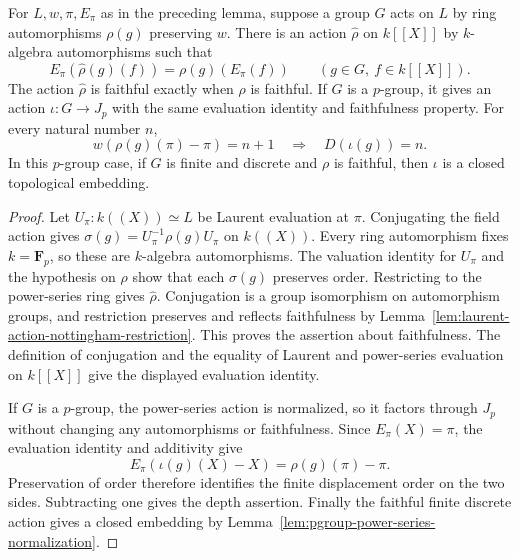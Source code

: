\begin{lemma}
\label{lem:artin-schreier-uniformizer-action}
\leanok
For $L,w,\pi,E_\pi$ as in the preceding lemma, suppose a group $G$
acts on $L$ by ring automorphisms $\rho(g)$ preserving $w$.
There is an action $\widehat\rho$ on $k[[X]]$ by $k$-algebra
automorphisms such that
\[
 E_\pi(\widehat\rho(g)(f))=\rho(g)(E_\pi(f))
 \qquad(g\in G,\ f\in k[[X]]).
\]
The action $\widehat\rho$ is faithful exactly when $\rho$ is faithful.
If $G$ is a $p$-group, it gives an action $\iota:G\to J_p$ with
the same evaluation identity and faithfulness property. For every
natural number $n$,
\[
 w(\rho(g)(\pi)-\pi)=n+1\quad\Longrightarrow\quad D(\iota(g))=n.
\]
In this $p$-group case, if $G$ is finite and discrete and $\rho$
is faithful, then $\iota$ is a closed topological embedding.
\end{lemma}

\begin{proof}
Let $U_\pi:k((X))\simeq L$ be Laurent evaluation at $\pi$.
Conjugating the field action gives
$\sigma(g)=U_\pi^{-1}\rho(g)U_\pi$ on $k((X))$.
Every ring automorphism fixes $k=\mathbf F_p$, so these are
$k$-algebra automorphisms. The valuation identity for $U_\pi$
and the hypothesis on $\rho$ show that each $\sigma(g)$ preserves
order. Restricting to the power-series ring gives $\widehat\rho$.
Conjugation is a group isomorphism on automorphism groups, and
restriction preserves and reflects faithfulness by
Lemma~\ref{lem:laurent-action-nottingham-restriction}.
This proves the assertion about faithfulness. The definition of
conjugation and the equality of Laurent and power-series evaluation
on $k[[X]]$ give the displayed evaluation identity.

If $G$ is a $p$-group, the power-series action is normalized,
so it factors through $J_p$ without changing any automorphisms
or faithfulness. Since $E_\pi(X)=\pi$, the evaluation identity
and additivity give
\[
 E_\pi(\iota(g)(X)-X)=\rho(g)(\pi)-\pi.
\]
Preservation of order therefore identifies the finite displacement
order on the two sides. Subtracting one gives the depth assertion.
Finally the faithful finite discrete action gives a closed
embedding by Lemma~\ref{lem:pgroup-power-series-normalization}.
\end{proof}

